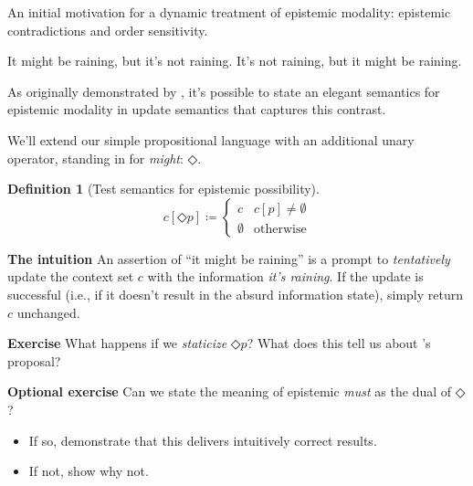 \documentclass[nols,twoside,nofonts,nobib,nohyper]{tufte-handout}
\theoremstyle{definition}
\newtheorem{definition}{Definition}[section]
\begin{document}
An initial motivation for a dynamic treatment of epistemic modality: epistemic contradictions and order sensitivity.

\pex\label{moore}
\a{}It might be raining, but it's not raining.\label{moore1}
\a\ljudge{\#}It's not raining, but it might be raining.\label{moore2}
\xe

As originally demonstrated by \citet{Veltman1996}, it's possible to state an elegant semantics for epistemic modality in update semantics that captures this contrast.

We'll extend our simple propositional language with an additional unary operator, standing in for \textit{might}: $◇$.

\begin{definition}[Test semantics for epistemic possibility]
  $$
  c[◇ p] ≔ \begin{cases}
    c&c[p] ≠ ∅\\
    ∅&\text{otherwise}
    \end{cases}
  $$
\end{definition}

\begin{tcolorbox}
  \textbf{The intuition}
  \tcblower
  An assertion of \enquote{it might be raining} is a prompt to \textit{tentatively} update the context set $c$ with the information \textit{it's raining}. If the update is successful (i.e., if it doesn't result in the absurd information state), simply return $c$ unchanged.
\end{tcolorbox}

\begin{tcolorbox}
  \textbf{Exercise}
  \tcblower
  What happens if we \textit{staticize} $◇ p$? What does this tell us about \citeauthor{Veltman1996}'s proposal?
\end{tcolorbox}

\begin{tcolorbox}
  \textbf{Optional exercise}
  \tcblower
  Can we state the meaning of epistemic \textit{must} as the dual of $◇$?
  \begin{itemize}
    \item If so, demonstrate that this delivers intuitively correct results.
    \item If not, show why not.
  \end{itemize}

\end{tcolorbox}
\end{document}
